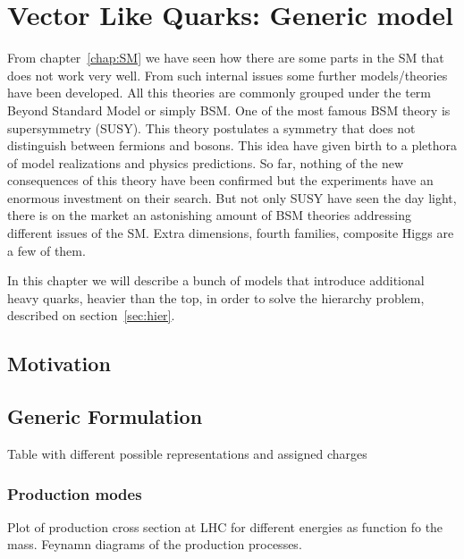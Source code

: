 \chapter[VLQ models]{Vector Like Quarks: Generic model}
\label{chap:VLQ}

From chapter~\ref{chap:SM} we have seen how there are some parts in the SM that does not work very well. From such internal issues some further models/theories have been developed. All this theories are commonly grouped under the term Beyond Standard Model or simply BSM. One of the most famous BSM theory is supersymmetry (SUSY). This theory postulates a symmetry that does not distinguish between fermions and bosons. This idea have given birth to a plethora of model realizations and physics predictions. So far, nothing of the new consequences of this theory have been confirmed but the experiments have an enormous investment on their search. But not only SUSY have seen the day light, there is on the market an astonishing amount of BSM theories addressing different issues of the SM. Extra dimensions, fourth families, composite Higgs are a few of them.

In this chapter we will describe a bunch of models that introduce additional heavy quarks, heavier than the top, in order to solve the hierarchy problem, described on section~\ref{sec:hier}. 

\section{Motivation}
\label{sec:motiv}

\section{Generic Formulation}
\label{sec:form}

\begin{TOINCLUDE}Table with different possible representations and assigned charges\end{TOINCLUDE}

\subsection{Production modes}
\label{sec:prod}

\begin{TOINCLUDE}Plot of production cross section at LHC for different energies as function fo the mass. Feynamn diagrams of the production processes.\end{TOINCLUDE}

